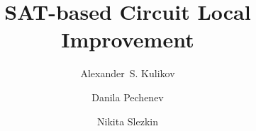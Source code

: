 \documentclass[a4paper, USenglish, cleveref, autoref, thm-restate]{lipics-v2021}
\title{SAT-based Circuit Local Improvement} %
\author{Alexander~S. Kulikov}{Steklov Mathematical Institute at St.~Petersburg, Russian Academy of Sciences \and St.~Petersburg State University \and \url{https://logic.pdmi.ras.ru/~kulikov/}}{kulikov@logic.pdmi.ras.ru}{https://orcid.org/0000-0002-5656-0336}{Supported by Russian Science Foundation (18-71-10042).}
\author{Danila Pechenev}{St.~Petersburg State University}{danil-pechenev@mail.ru }{}{}
\author{Nikita Slezkin}{St.~Petersburg State University}{ne.slezkin@gmail.com}{https://orcid.org/0000-0003-1904-9261}{}
\begin{document}
    \listoftodos
    \tableofcontents

    
\end{document}
